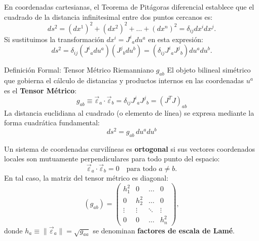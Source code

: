 \documentclass[11pt,letterpaper]{article}
\begin{document}

En coordenadas cartesianas, el Teorema de Pitágoras diferencial establece que el cuadrado de la distancia infinitesimal entre dos puntos cercanos es:
\[
ds^2 = (dx^1)^2 + (dx^2)^2 + \dots + (dx^n)^2 = \delta_{ij} dx^i dx^j.
\]
Si sustituimos la transformación $dx^i = J^i{}_a du^a$ en esta expresión:
\[
ds^2 = \delta_{ij} (J^i{}_a du^a)(J^j{}_b du^b) = (\delta_{ij} J^i{}_a J^j{}_b) du^a du^b.
\]

\begin{theorembox}{Definición Formal: Tensor Métrico Riemanniano $g_{ab}$}
El objeto bilineal simétrico que gobierna el cálculo de distancias y productos internos en las coordenadas $u^a$ es el \textbf{Tensor Métrico}:
\[
\boxed{g_{ab} \equiv \vec{\varepsilon}_a \cdot \vec{\varepsilon}_b = \delta_{ij} J^i{}_a J^j{}_b = (J^T J)_{ab}}
\]
La distancia euclidiana al cuadrado (o elemento de línea) se expresa mediante la forma cuadrática fundamental:
\[
\boxed{ds^2 = g_{ab}\,du^a du^b}
\]
\end{theorembox}

Un sistema de coordenadas curvilíneas es \textbf{ortogonal} si sus vectores coordenados locales son mutuamente perpendiculares para todo punto del espacio:
\[
\vec{\varepsilon}_a \cdot \vec{\varepsilon}_b = 0 \quad \text{para todo } a \neq b.
\]
En tal caso, la matriz del tensor métrico es diagonal:
\[
(g_{ab}) = \begin{pmatrix} h_1^2 & 0 & \dots & 0 \\ 0 & h_2^2 & \dots & 0 \\ \vdots & \vdots & \ddots & \vdots \\ 0 & 0 & \dots & h_n^2 \end{pmatrix},
\]
donde $h_a \equiv \|\vec{\varepsilon}_a\| = \sqrt{g_{aa}}$ se denominan \textbf{factores de escala de Lamé}.

\end{document}
